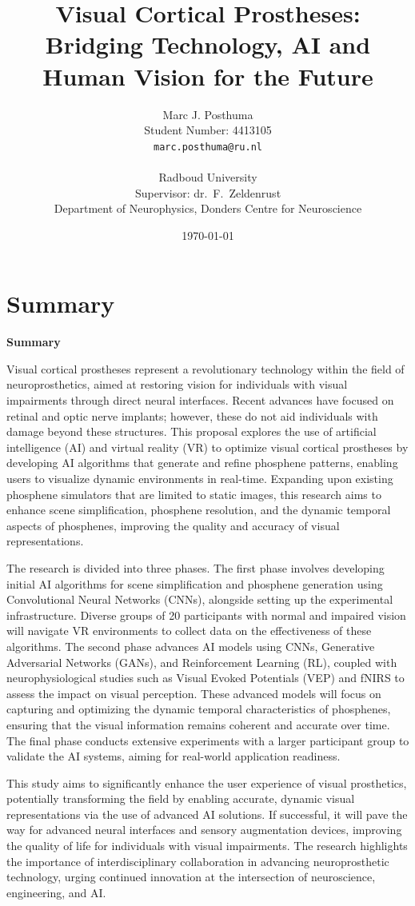 \documentclass[10pt]{article}
\title{Visual Cortical Prostheses: Bridging Technology, AI and Human Vision for the Future}
\author{
  Marc J. Posthuma\\
  Student Number: 4413105\\
  \texttt{marc.posthuma@ru.nl}\\
  \\
  Radboud University\\
  Supervisor: dr.\ F.\ Zeldenrust\\
  Department of Neurophysics, Donders Centre for Neuroscience
}
\date{\today}
\makeatletter
\renewenvironment{abstract}{%
    \if@twocolumn%
      \section*{\abstractname}%
    \else
      \begin{center}%
        {\bfseries \large\abstractname\vspace{-.5em}\vspace{\z@}}%
      \end{center}%
      \quotation\small %
    \fi}
    {\if@twocolumn\else\endquotation\fi}%
\renewcommand{\abstractname}{Summary}
\makeatother
\begin{document}


\maketitle
\thispagestyle{firstpage} %
\begin{abstract}
  \noindent Visual cortical prostheses represent a revolutionary technology
  within the field of neuroprosthetics, aimed at restoring vision for
  individuals with visual impairments through direct neural interfaces. Recent
  advances have focused on retinal and optic nerve implants; however, these do
  not aid individuals with damage beyond these structures. This proposal
  explores the use of artificial intelligence (AI) and virtual reality (VR) to
  optimize visual cortical prostheses by developing AI algorithms that generate
  and refine phosphene patterns, enabling users to visualize dynamic
  environments in real-time. Expanding upon existing phosphene simulators that
  are limited to static images, this research aims to enhance scene
  simplification, phosphene resolution, and the dynamic temporal aspects of
  phosphenes, improving the quality and accuracy of visual representations.

  The research is divided into three phases. The first phase involves developing
  initial AI algorithms for scene simplification and phosphene generation using
  Convolutional Neural Networks (CNNs), alongside setting up the experimental
  infrastructure. Diverse groups of 20 participants with normal and impaired
  vision will navigate VR environments to collect data on the effectiveness of
  these algorithms. The second phase advances AI models using CNNs, Generative
  Adversarial Networks (GANs), and Reinforcement Learning (RL), coupled with
  neurophysiological studies such as Visual Evoked Potentials (VEP) and fNIRS to
  assess the impact on visual perception. These advanced models will focus on
  capturing and optimizing the dynamic temporal characteristics of phosphenes,
  ensuring that the visual information remains coherent and accurate over time.
  The final phase conducts extensive experiments with a larger participant group
  to validate the AI systems, aiming for real-world application readiness.

  This study aims to significantly enhance the user experience of visual
  prosthetics, potentially transforming the field by enabling accurate, dynamic
  visual representations via the use of advanced AI solutions. If successful, it
  will pave the way for advanced neural interfaces and sensory augmentation
  devices, improving the quality of life for individuals with visual impairments.
  The research highlights the importance of interdisciplinary collaboration in
  advancing neuroprosthetic technology, urging continued innovation at the
  intersection of neuroscience, engineering, and AI\@.
\end{abstract}
\end{document}
